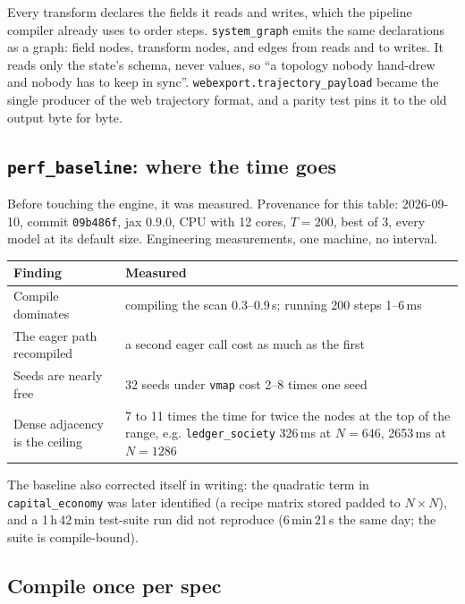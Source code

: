 \documentclass[11pt]{article}
\newcommand{\code}[1]{\texttt{#1}}
\begin{document}
Every transform declares the fields it reads and writes, which the pipeline compiler
already uses to order steps. \code{system\_graph} emits the same declarations as a
graph: field nodes, transform nodes, and edges from reads and to writes. It reads only
the state's schema, never values, so ``a topology nobody hand-drew and nobody has to
keep in sync''. \code{webexport.trajectory\_payload} became the single producer of the
web trajectory format, and a parity test pins it to the old output byte for byte.

\subsection{\code{perf\_baseline}: where the time goes}

Before touching the engine, it was measured. Provenance for this table: 2026-09-10,
commit \code{09b486f}, jax 0.9.0, CPU with 12 cores, $T=200$, best of 3, every model at
its default size. Engineering measurements, one machine, no interval.

\begin{center}
\begin{tabular}{@{}p{4.6cm}p{9.6cm}@{}}
\toprule
\textbf{Finding} & \textbf{Measured} \\
\midrule
Compile dominates & compiling the scan 0.3--0.9\,s; running 200 steps 1--6\,ms \\
The eager path recompiled & a second eager call cost as much as the first \\
Seeds are nearly free & 32 seeds under \code{vmap} cost 2--8 times one seed \\
Dense adjacency is the ceiling & 7 to 11 times the time for twice the nodes at the top of the range, e.g. \code{ledger\_society} 326\,ms at $N=646$, 2653\,ms at $N=1286$ \\
\bottomrule
\end{tabular}
\end{center}

\noindent The baseline also corrected itself in writing: the quadratic term in
\code{capital\_economy} was later identified (a recipe matrix stored padded to $N\times
N$), and a 1\,h\,42\,min test-suite run did not reproduce (6\,min\,21\,s the same day;
the suite is compile-bound).

\subsection{Compile once per spec}
\end{document}
